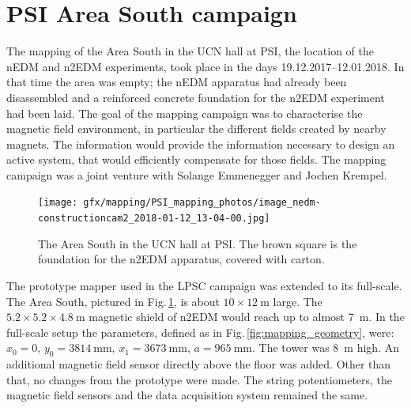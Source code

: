 \section{PSI Area South campaign}
The mapping of the Area South in the UCN hall at PSI, the location of the nEDM and n2EDM experiments, took place in the days 19.12.2017--12.01.2018. In that time the area was empty; the nEDM apparatus had already been disassembled and a reinforced concrete foundation for the n2EDM experiment had been laid.
The goal of the mapping campaign was to characterise the magnetic field environment, in particular the different fields created by nearby magnets.
The information would provide the information necessary to design an active system, that would efficiently compensate for those fields.
The mapping campaign was a joint venture with Solange Emmenegger and Jochen Krempel.

\begin{figure}
  \centering
  \texttt{[image: gfx/mapping/PSI\_mapping\_photos/image\_nedm-constructioncam2\_2018-01-12\_13-04-00.jpg]}
  \caption{The Area South in the UCN hall at PSI\@. The brown square is the foundation for the n2EDM apparatus, covered with carton. }\label{fig:mapping_photo}
\end{figure}

The prototype mapper used in the LPSC campaign was extended to its full-scale. The Area South, pictured in Fig.\,\ref{fig:mapping_photo}, is about $10 \times \SI{12}{\metre}$ large.
The $5.2 \times 5.2 \times \SI{4.8}{\metre}$ magnetic shield of n2EDM would reach up to almost \SI{7}{\metre}. In the full-scale setup the parameters, defined as in Fig.\,\ref{fig:mapping_geometry}, were:
$x_0 = 0$, $y_0 = \SI{3814}{\milli\metre}$, $x_1 = \SI{3673}{\milli\metre}$, $a = \SI{965}{\milli\metre}$. The tower was \SI{8}{\metre} high.
An additional magnetic field sensor directly above the floor was added. Other than that, no changes from the prototype were made. The string potentiometers, the magnetic field sensors and the data acquisition system remained the same.

